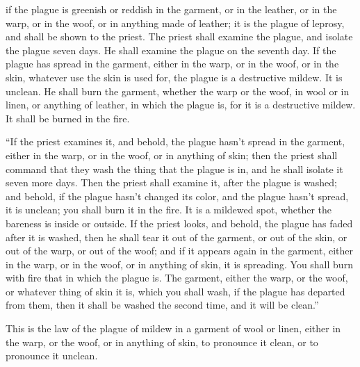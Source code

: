 {if the plague is greenish or reddish in the garment, or in the leather, or in the warp, or in the woof, or in anything made of leather; it is the plague of leprosy, and shall be shown to the priest.
The priest shall examine the plague, and isolate the plague seven days.
He shall examine the plague on the seventh day. If the plague has spread in the garment, either in the warp, or in the woof, or in the skin, whatever use the skin is used for, the plague is a destructive mildew. It is unclean.
He shall burn the garment, whether the warp or the woof, in wool or in linen, or anything of leather, in which the plague is, for it is a destructive mildew. It shall be burned in the fire.
\par }{\PP {}“If the priest examines it, and behold, the plague hasn’t spread in the garment, either in the warp, or in the woof, or in anything of skin;
then the priest shall command that they wash the thing that the plague is in, and he shall isolate it seven more days.
Then the priest shall examine it, after the plague is washed; and behold, if the plague hasn’t changed its color, and the plague hasn’t spread, it is unclean; you shall burn it in the fire. It is a mildewed spot, whether the bareness is inside or outside.
If the priest looks, and behold, the plague has faded after it is washed, then he shall tear it out of the garment, or out of the skin, or out of the warp, or out of the woof;
and if it appears again in the garment, either in the warp, or in the woof, or in anything of skin, it is spreading. You shall burn with fire that in which the plague is.
The garment, either the warp, or the woof, or whatever thing of skin it is, which you shall wash, if the plague has departed from them, then it shall be washed the second time, and it will be clean.”
\par }{\PP {}This is the law of the plague of mildew in a garment of wool or linen, either in the warp, or the woof, or in anything of skin, to pronounce it clean, or to pronounce it unclean.

}
